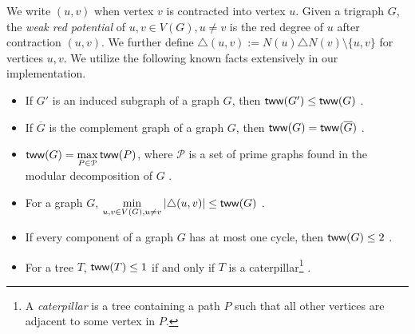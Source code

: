 \documentclass[a4paper,UKenglish,cleveref, autoref, thm-restate]{lipics-v2021}
\begin{document}
We write $(u,v)$ when vertex $v$ is contracted into vertex $u$.
Given a trigraph $G$, the \emph{weak red potential} of $u,v \in V(G), u \neq v$
is the red degree of $u$ after contraction $(u,v)$.
%
We further define
$\triangle(u,v) := N(u) \triangle N(v) \setminus \{u,v\}$ for vertices $u,v$.
%
%
%
%
%
%
We utilize the following known facts extensively in our implementation.
\begin{itemize}
    \item If $G'$ is an induced subgraph of a graph $G$, then $\textnormal{\textsf{tww}}(G') \leq \textnormal{\textsf{tww}}(G)$ \cite{bonnet_twin-width_2020}.
    \item If $\overline{G}$ is the complement graph of a graph $G$, then $\textnormal{\textsf{tww}}(G) = \textnormal{\textsf{tww}}(\overline{G})$ \cite{bonnet_twin-width_2020}.
    \item $\displaystyle \textnormal{\textsf{tww}}(G) = \max_{P \in \mathcal{P}} \textnormal{\textsf{tww}}(P)$,
    where $\mathcal{P}$ is a set of prime graphs found in the modular decomposition of $G$ \cite{schidler_sat_2021}.
    \item For a graph $G$, $\displaystyle \min_{u,v\in V(G), u \neq v}|\triangle(u,v)| \leq \textnormal{\textsf{tww}}(G)$ \cite{schidler_sat_2021}.
    \item If every component of a graph $G$ has at most one cycle, then $\textnormal{\textsf{tww}}(G) \leq 2$ \cite{ahn_bounds_2022}.
    \item For a tree $T$, $\textnormal{\textsf{tww}}(T) \leq 1$ if and only if $T$ is a caterpillar\footnote{%
    A \emph{caterpillar} is a tree containing a path $P$ such that all other vertices are
    adjacent to some vertex in $P$.
    } \cite{ahn_bounds_2022}.
\end{itemize}
\end{document}
